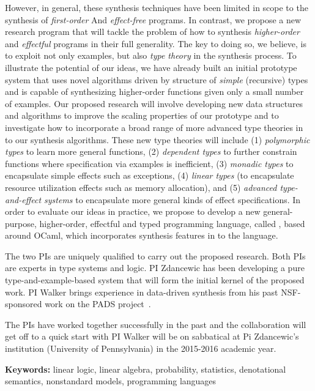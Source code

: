 However, in general, these synthesis techniques have been limited in
scope to the synthesis of \emph{first-order} And \emph{effect-free} 
programs.  In contrast, we propose a new research program that will
tackle the problem of how to synthesis \emph{higher-order} and
\emph{effectful} programs in their full generality.  The key to doing
so, we believe, is to exploit not only examples, but also \emph{type theory}
in the synthesis process.  To illustrate the potential
of our ideas, we have already built an initial prototype
system that uses novel algorithms driven by structure of 
\emph{simple} (recursive) types and is capable of synthesizing
higher-order functions given only a small number of examples.
Our proposed research will involve developing new data structures
and algorithms to improve the scaling properties of our prototype
and to investigate how to incorporate a broad range of more advanced
type theories in to our synthesis algorithms.  These new type theories
will include 
(1) \emph{polymorphic types} to learn more general functions, 
(2) \emph{dependent types} to further constrain functions where specification
via examples is inefficient, 
(3) \emph{monadic types} to encapsulate simple effects such as exceptions, 
(4) \emph{linear types} (to encapsulate resource utilization effects such as 
memory allocation), and 
(5) \emph{advanced type-and-effect systems} to encapsulate more general
kinds of effect specifications.
In order to evaluate our ideas in practice, we propose to develop a new
general-purpose, higher-order, effectful and typed programming language,
called \OSynth{}, based around OCaml, which incorporates synthesis
features in to the language.


The two PIs are uniquely qualified to carry out the proposed research.
Both PIs are experts in type systems and logic.  PI Zdancewic has been
developing a pure type-and-example-based system that will form the
initial kernel of the proposed work.  PI Walker brings experience in
data-driven synthesis from his past NSF-sponsored work on the PADS
project~\cite{pads,pads-synth}.

The PIs have worked together successfully in the past and the
collaboration will get off to a quick start with PI Walker will be on
sabbatical at Pi Zdancewic's institution (University of Pennsylvania)
in the 2015-2016 academic year.

\medskip
\noindent\textbf{Keywords:} linear logic, linear algebra, probability,
statistics, denotational semantics, nonstandard models, programming
languages



